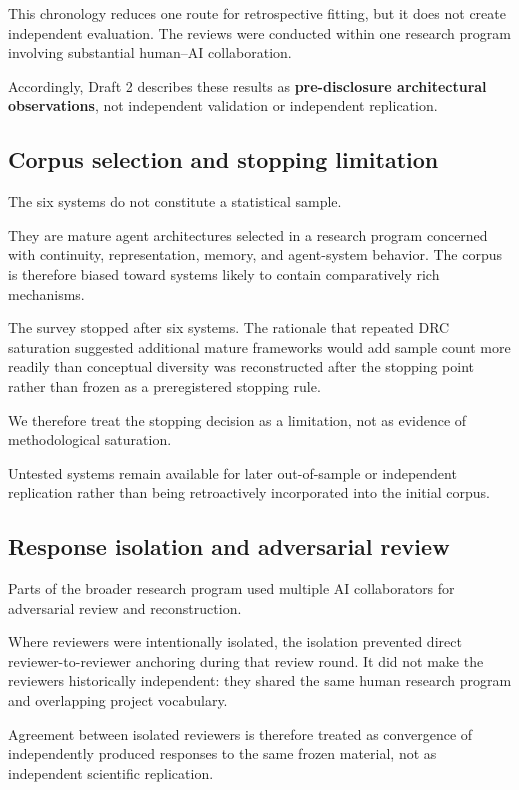 \documentclass[11pt]{article}
\begin{document}
This chronology reduces one route for retrospective fitting, but it does not create independent evaluation. The reviews were conducted within one research program involving substantial human--AI collaboration.

Accordingly, Draft 2 describes these results as \textbf{pre-disclosure architectural observations}, not independent validation or independent replication.

\subsection{Corpus selection and stopping limitation}

The six systems do not constitute a statistical sample.

They are mature agent architectures selected in a research program concerned with continuity, representation, memory, and agent-system behavior. The corpus is therefore biased toward systems likely to contain comparatively rich mechanisms.

The survey stopped after six systems. The rationale that repeated DRC saturation suggested additional mature frameworks would add sample count more readily than conceptual diversity was reconstructed after the stopping point rather than frozen as a preregistered stopping rule.

We therefore treat the stopping decision as a limitation, not as evidence of methodological saturation.

Untested systems remain available for later out-of-sample or independent replication rather than being retroactively incorporated into the initial corpus.

\subsection{Response isolation and adversarial review}

Parts of the broader research program used multiple AI collaborators for adversarial review and reconstruction.

Where reviewers were intentionally isolated, the isolation prevented direct reviewer-to-reviewer anchoring during that review round. It did not make the reviewers historically independent: they shared the same human research program and overlapping project vocabulary.

Agreement between isolated reviewers is therefore treated as convergence of independently produced responses to the same frozen material, not as independent scientific replication.
\end{document}
